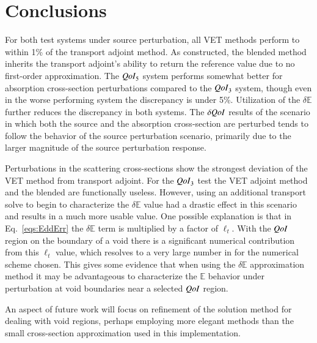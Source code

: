 \documentclass{anstrans}
\newcommand{\Edd}{\mathbb{E}}
\newcommand{\isigt}{\ell_t}
\newcommand{\qoi}{{\it QoI}\xspace}
\begin{document}
\section{Conclusions}
For both test systems under source perturbation, all VET methods perform to within 1\% of the transport adjoint method. As constructed, the blended method inherits the transport adjoint's ability to return the reference value due to no first-order approximation. The $\qoi_5$ system performs somewhat better for absorption cross-section perturbations compared to the $\qoi_3$ system, though even in the worse performing system the discrepancy is under 5\%. Utilization of the $\delta \Edd$ further reduces the discrepancy in both systems. The $\delta \qoi$ results of the scenario in which both the source and the absorption cross-section are perturbed tends to follow the behavior of the source perturbation scenario, primarily due to the larger magnitude of the source perturbation response. 

Perturbations in the scattering cross-sections show the strongest deviation of  the VET method from transport adjoint. For the $\qoi_3$ test the VET adjoint method and the blended are functionally useless. However, using an additional transport solve to begin to characterize the $\delta \Edd$ value had a drastic effect in this scenario and results in a much more usable value. One possible explanation is that in Eq.~\eqref{eqs:EddErr} the $\delta \Edd$ term is multiplied by a factor of $\isigt$. With the $\qoi$ region on the boundary of a void there is a significant numerical contribution from this $\isigt$ value, which resolves to a very large number in for the numerical scheme chosen. This gives some evidence that when using the $\delta \Edd$ approximation method it may be advantageous to characterize the $\Edd$ behavior under perturbation at void boundaries near a selected $\qoi$ region.

An aspect of future work will focus on refinement of the solution method for dealing with void regions, perhaps employing more elegant methods than the small cross-section approximation used in this implementation.

\appendix
\end{document}
